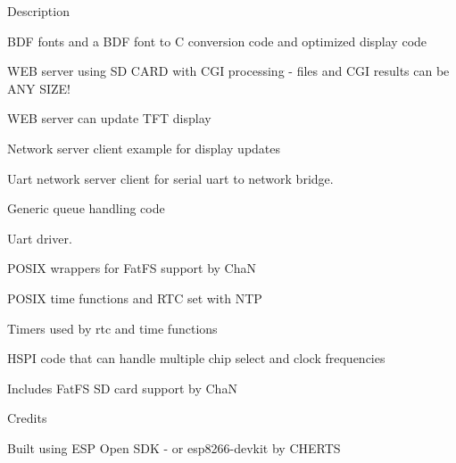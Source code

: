 \begin{DoxyParagraph}{Description}
\begin{DoxyItemize}
\begin{DoxyItemize}
\item B\-D\-F fonts and a B\-D\-F font to C conversion code and optimized display code
\item W\-E\-B server using S\-D C\-A\-R\-D with C\-G\-I processing -\/ files and C\-G\-I results can be A\-N\-Y S\-I\-Z\-E!
\item W\-E\-B server can update T\-F\-T display
\item Network server client example for display updates
\item Uart network server client for serial uart to network bridge.
\item Generic queue handling code
\item Uart driver.
\item P\-O\-S\-I\-X wrappers for Fat\-F\-S support by Cha\-N
\item P\-O\-S\-I\-X time functions and R\-T\-C set with N\-T\-P
\item Timers used by rtc and time functions
\item H\-S\-P\-I code that can handle multiple chip select and clock frequencies
\end{DoxyItemize}
\item Includes Fat\-F\-S S\-D card support by Cha\-N
\end{DoxyItemize}
\end{DoxyParagraph}
\begin{DoxyParagraph}{Credits}

\begin{DoxyItemize}
\item Built using E\-S\-P Open S\-D\-K -\/ or esp8266-\/devkit by C\-H\-E\-R\-T\-S 
\end{DoxyItemize}
\end{DoxyParagraph}

